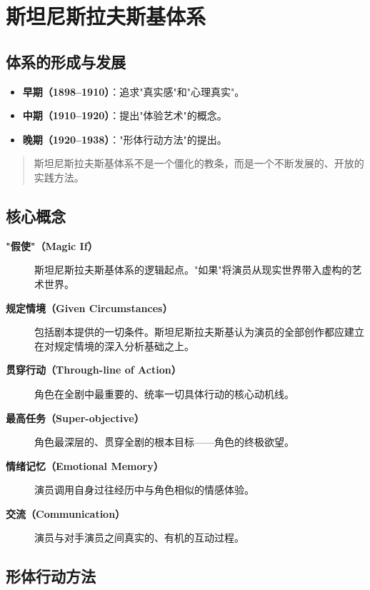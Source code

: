 \section{斯坦尼斯拉夫斯基体系}

\subsection{体系的形成与发展}

\begin{itemize}
    \item \textbf{早期（1898--1910）}：追求"真实感"和"心理真实"。
    \item \textbf{中期（1910--1920）}：提出"体验艺术"的概念。
    \item \textbf{晚期（1920--1938）}："形体行动方法"的提出。
\end{itemize}

\begin{quote}
斯坦尼斯拉夫斯基体系不是一个僵化的教条，而是一个不断发展的、开放的实践方法。\cite{stanislavski:system}
\end{quote}

\subsection{核心概念}

\begin{description}
    \item[\textbf{"假使"（Magic If）}] 斯坦尼斯拉夫斯基体系的逻辑起点。"如果"将演员从现实世界带入虚构的艺术世界\cite{stanislavski:system}。
    \item[\textbf{规定情境（Given Circumstances）}] 包括剧本提供的一切条件。斯坦尼斯拉夫斯基认为演员的全部创作都应建立在对规定情境的深入分析基础之上\cite{stanislavski:system}。
    \item[\textbf{贯穿行动（Through-line of Action）}] 角色在全剧中最重要的、统率一切具体行动的核心动机线。
    \item[\textbf{最高任务（Super-objective）}] 角色最深层的、贯穿全剧的根本目标——角色的终极欲望。
    \item[\textbf{情绪记忆（Emotional Memory）}] 演员调用自身过往经历中与角色相似的情感体验\cite{stanislavski:system}。
    \item[\textbf{交流（Communication）}] 演员与对手演员之间真实的、有机的互动过程。
\end{description}

\subsection{形体行动方法}

